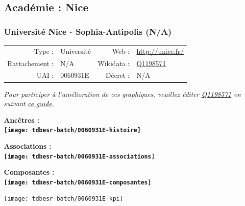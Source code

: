 \documentclass[12pt,french,]{article}
\begin{document}
\hypertarget{acaduxe9mie-nice}{%
\subsection{Académie : Nice}\label{acaduxe9mie-nice}}

\hypertarget{universituxe9-nice---sophia-antipolis-na}{%
\subsubsection{Université Nice - Sophia-Antipolis
(N/A)}\label{universituxe9-nice---sophia-antipolis-na}}

\begin{tabular*}{\textwidth}{rp{5cm}rl}  
\hline  
Type : & Université & Web : &\href{http://unice.fr/}{http://unice.fr/} \\  
Rattachement : & N/A & Wikidata : & \href{https://www.wikidata.org/entity/Q1198571}{Q1198571} \\  
UAI : & 0060931E & Décret : & N/A \\  
\hline  
\end{tabular*}

\textit{\scriptsize Pour participer à l'amélioration de ces graphiques, veuillez éditer  \href{https://www.wikidata.org/entity/Q1198571}{Q1198571}  en suivant \href{https://github.com/cpesr/wikidataESR/blob/master/Rmd/wikidataESR.md}{ce guide.}}

\vspace{1cm}  
\begin{minipage}[b]{0.50\textwidth}\begin{center} \bf Ancêtres : \\  
\texttt{[image: tdbesr-batch/0060931E-histoire]} \end{center}\end{minipage}\begin{minipage}[b]{0.50\textwidth}\begin{center} \bf Associations : \\  
\texttt{[image: tdbesr-batch/0060931E-associations]} \end{center}\end{minipage}

\hrulefill

\begin{center} \bf Composantes : \\  
\texttt{[image: tdbesr-batch/0060931E-composantes]} \end{center}

\begin{center}\texttt{[image: tdbesr-batch/0060931E-kpi]} \end{center}\checkoddpage
\end{document}

